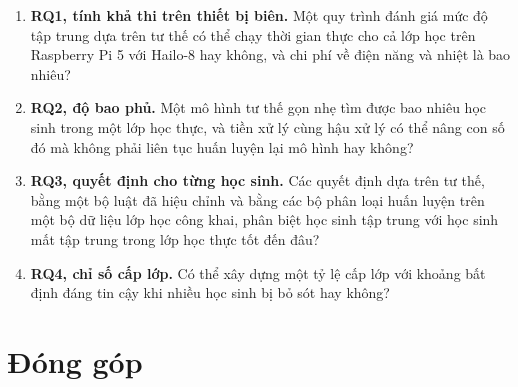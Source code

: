 \begin{enumerate}
\def\labelenumi{\arabic{enumi}.}
\tightlist
\item
  \textbf{RQ1, tính khả thi trên thiết bị biên.} Một quy trình đánh giá mức độ tập trung dựa trên tư thế có thể chạy thời gian thực cho cả lớp học trên Raspberry Pi 5 với Hailo-8 hay không, và chi phí về điện năng và nhiệt là bao nhiêu?
\item
  \textbf{RQ2, độ bao phủ.} Một mô hình tư thế gọn nhẹ tìm được bao nhiêu học sinh trong một lớp học thực, và tiền xử lý cùng hậu xử lý có thể nâng con số đó mà không phải liên tục huấn luyện lại mô hình hay không?
\item
  \textbf{RQ3, quyết định cho từng học sinh.} Các quyết định dựa trên tư thế, bằng một bộ luật đã hiệu chỉnh và bằng các bộ phân loại huấn luyện trên một bộ dữ liệu lớp học công khai, phân biệt học sinh tập trung với học sinh mất tập trung trong lớp học thực tốt đến đâu?
\item
  \textbf{RQ4, chỉ số cấp lớp.} Có thể xây dựng một tỷ lệ cấp lớp với khoảng bất định đáng tin cậy khi nhiều học sinh bị bỏ sót hay không?
\end{enumerate}

\section{Đóng góp}

